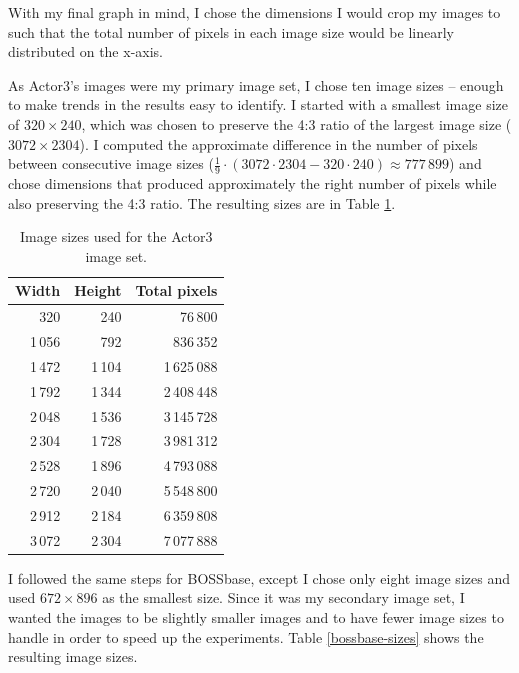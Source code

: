 \documentclass[11pt,a4paper,twoside,openright]{report}
\begin{document}
With my final graph in mind, I chose the dimensions I would crop my images to such that the total number of pixels in each image size would be linearly distributed on the x-axis.

As Actor3's images were my primary image set, I chose ten image sizes -- enough to make trends in the results easy to identify. I started with a smallest image size of $320\times240$, which was chosen to preserve the 4:3 ratio of the largest image size ($3072\times2304$). I computed the approximate difference in the number of pixels between consecutive image sizes ($\frac{1}{9} \cdot (3072 \cdot 2304 - 320 \cdot 240) \approx 777\,899$) and chose dimensions that produced approximately the right number of pixels while also preserving the 4:3 ratio. The resulting sizes are in Table \ref{actor3-sizes}.

\begin{table}[htbp]
    \begin{center}
        \begin{tabular}{ r  r | r}
        Width & Height & Total pixels \\ \hline
        320 & 240 & 76\,800 \\
        1\,056 & 792 & 836\,352 \\
        1\,472 & 1\,104 & 1\,625\,088 \\
        1\,792 & 1\,344 & 2\,408\,448 \\
        2\,048 & 1\,536 & 3\,145\,728 \\
        2\,304 & 1\,728 & 3\,981\,312 \\
        2\,528 & 1\,896 & 4\,793\,088 \\
        2\,720 & 2\,040 & 5\,548\,800 \\
        2\,912 & 2\,184 & 6\,359\,808 \\
        3\,072 & 2\,304 & 7\,077\,888 \\
        \end{tabular}
        \caption{Image sizes used for the Actor3 image set.}
        \label{actor3-sizes}
    \end{center}
\end{table}

I followed the same steps for BOSSbase, except I chose only eight image sizes and used $672\times896$ as the smallest size. Since it was my secondary image set, I wanted the images to be slightly smaller images and to have fewer image sizes to handle in order to speed up the experiments. Table \ref{bossbase-sizes} shows the resulting image sizes.
\end{document}
